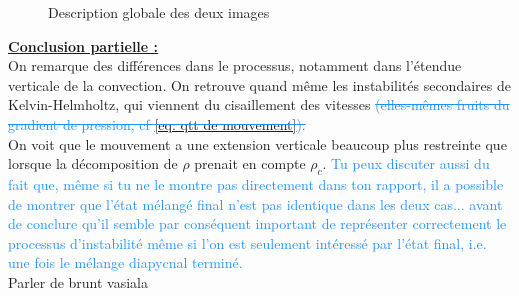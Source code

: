 \documentclass{rapportECC}
\newcommand{\FAadd}[1]{\textcolor{DodgerBlue}{{#1}}}                     %
\newcommand{\FAdel}[1]{\textcolor{DodgerBlue}{\sout{#1}}}                %
\begin{document}
\begin{figure}[H]
    \centering
    \hfill
    \caption{Description globale des deux images}
    \label{fig:images_cote_a_cote}
\end{figure}
\underline{\textbf{Conclusion partielle :}} \\
On remarque des différences dans le processus, notamment dans l'étendue verticale de la convection. On retrouve quand même les instabilités secondaires de Kelvin-Helmholtz, qui viennent du cisaillement des vitesses \FAdel{(elles-mêmes fruits du gradient de pression, cf \eqref{eq: qtt de mouvement}).}\\
On voit que le mouvement a une extension verticale beaucoup plus restreinte que lorsque la décomposition de $\rho$ prenait en compte $\rho_c$. \FAadd{Tu peux discuter aussi du fait que, même si tu ne le montre pas directement dans ton rapport, il a possible de montrer que l'état mélangé final n'est pas identique dans les deux cas... avant de conclure qu'il semble par conséquent important de représenter correctement le processus d'instabilité même si l'on est seulement intéressé par l'état final, i.e. une fois le mélange diapycnal terminé.}
\\
Parler de brunt vasiala
\end{document}
